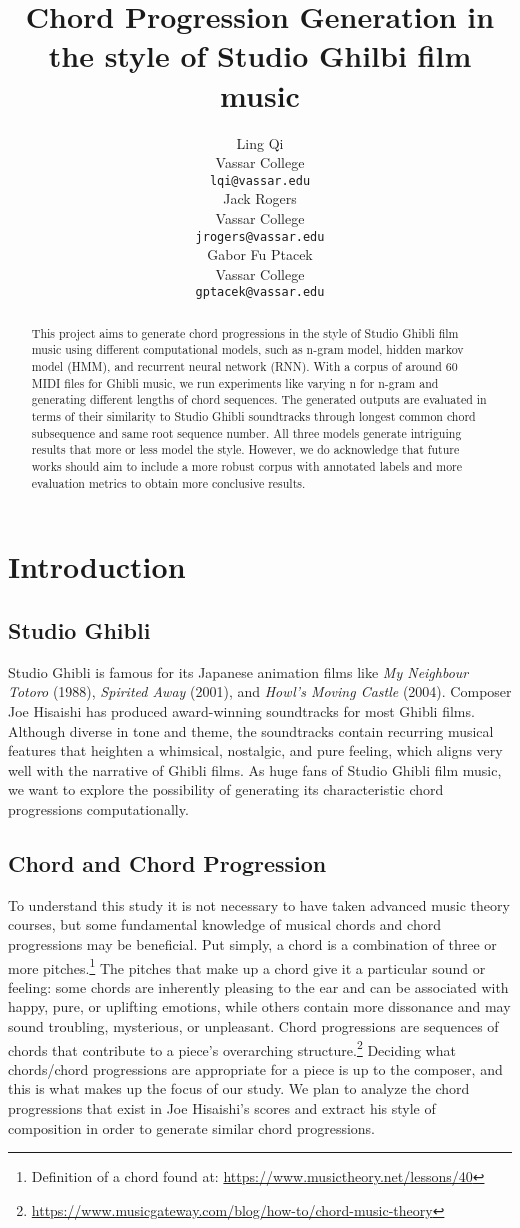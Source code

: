 \documentclass[11pt,a4paper]{article}
\title{Chord Progression Generation in the style of Studio Ghilbi film music}
\author{Ling Qi \\
  Vassar College \\
  \texttt{lqi@vassar.edu} \\\And
  Jack Rogers \\
  Vassar College\\
  \texttt{jrogers@vassar.edu} \\\And
  Gabor Fu Ptacek \\
  Vassar College\\
  \texttt{gptacek@vassar.edu} \\}
\date{}
\begin{document}
\maketitle
\begin{abstract}
This project aims to generate chord progressions in the style of Studio Ghibli film music using different computational models, such as n-gram model, hidden markov model (HMM), and recurrent neural network (RNN). With a corpus of around 60 MIDI files for Ghibli music, we run experiments like varying n for n-gram and generating different lengths of chord sequences. The generated outputs are evaluated in terms of their similarity to Studio Ghibli soundtracks through longest common chord subsequence and same root sequence number. All three models generate intriguing results that more or less model the style. However, we do acknowledge that future works should aim to include a more robust corpus with annotated labels and more evaluation metrics to obtain more conclusive results.
\end{abstract}

\section{Introduction}
\subsection{Studio Ghibli}
Studio Ghibli is famous for its Japanese animation films like \emph{My Neighbour Totoro} (1988), \emph{Spirited Away} (2001), and \emph{Howl’s Moving Castle} (2004). Composer Joe Hisaishi has produced award-winning soundtracks for most Ghibli films. Although diverse in tone and theme, the soundtracks contain recurring musical features that heighten a whimsical, nostalgic, and pure feeling, which aligns very well with the narrative of Ghibli films. As huge fans of Studio Ghibli film music, we want to explore the possibility of generating its characteristic chord progressions computationally.
\subsection{Chord and Chord Progression}
To understand this study it is not necessary to have taken advanced music theory courses, but some fundamental knowledge of musical chords and chord progressions may be beneficial. Put simply, a chord is a combination of three or more pitches.\footnote{Definition of a chord found at: \url{https://www.musictheory.net/lessons/40}} The pitches that make up a chord give it a particular sound or feeling: some chords are inherently pleasing to the ear and can be associated with happy, pure, or uplifting emotions, while others contain more dissonance and may sound troubling, mysterious, or unpleasant. Chord progressions are sequences of chords that contribute to a piece’s overarching structure.\footnote{\url{https://www.musicgateway.com/blog/how-to/chord-music-theory}} Deciding what chords/chord progressions are appropriate for a piece is up to the composer, and this is what makes up the focus of our study. We plan to analyze the chord progressions that exist in Joe Hisaishi’s scores and extract his style of composition in order to generate similar chord progressions. 
\end{document}
